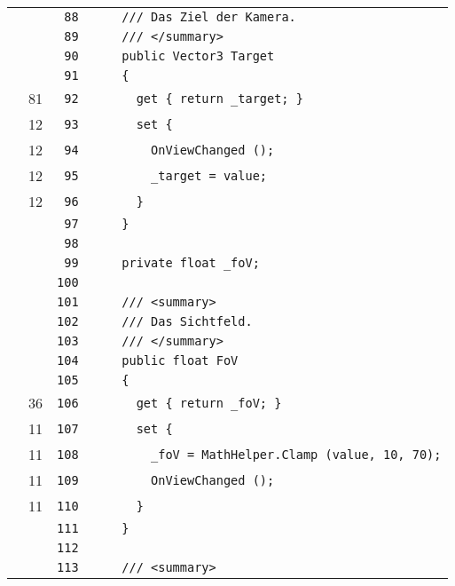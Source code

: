 \documentclass[a4paper,10pt]{article}
\begin{document}
\begin{longtable}[l]{lrrl}
\cellcolor{gray} &  & \verb~88~ & \verb~    /// Das Ziel der Kamera.~\\
\cellcolor{gray} &  & \verb~89~ & \verb~    /// </summary>~\\
\cellcolor{gray} &  & \verb~90~ & \verb~    public Vector3 Target~\\
\cellcolor{gray} &  & \verb~91~ & \verb~    {~\\
\cellcolor{green} & 81 & \verb~92~ & \verb~      get { return _target; }~\\
\cellcolor{green} & 12 & \verb~93~ & \verb~      set {~\\
\cellcolor{green} & 12 & \verb~94~ & \verb~        OnViewChanged ();~\\
\cellcolor{green} & 12 & \verb~95~ & \verb~        _target = value;~\\
\cellcolor{green} & 12 & \verb~96~ & \verb~      }~\\
\cellcolor{gray} &  & \verb~97~ & \verb~    }~\\
\cellcolor{gray} &  & \verb~98~ & \verb~~\\
\cellcolor{gray} &  & \verb~99~ & \verb~    private float _foV;~\\
\cellcolor{gray} &  & \verb~100~ & \verb~~\\
\cellcolor{gray} &  & \verb~101~ & \verb~    /// <summary>~\\
\cellcolor{gray} &  & \verb~102~ & \verb~    /// Das Sichtfeld.~\\
\cellcolor{gray} &  & \verb~103~ & \verb~    /// </summary>~\\
\cellcolor{gray} &  & \verb~104~ & \verb~    public float FoV~\\
\cellcolor{gray} &  & \verb~105~ & \verb~    {~\\
\cellcolor{green} & 36 & \verb~106~ & \verb~      get { return _foV; }~\\
\cellcolor{green} & 11 & \verb~107~ & \verb~      set {~\\
\cellcolor{green} & 11 & \verb~108~ & \verb~        _foV = MathHelper.Clamp (value, 10, 70);~\\
\cellcolor{green} & 11 & \verb~109~ & \verb~        OnViewChanged ();~\\
\cellcolor{green} & 11 & \verb~110~ & \verb~      }~\\
\cellcolor{gray} &  & \verb~111~ & \verb~    }~\\
\cellcolor{gray} &  & \verb~112~ & \verb~~\\
\cellcolor{gray} &  & \verb~113~ & \verb~    /// <summary>~\\

\end{longtable}
\end{document}
